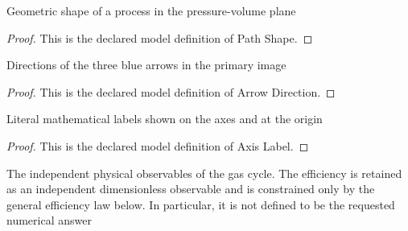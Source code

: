 \begin{definition}
  \label{def:physics:phyx-mini-0352:phyxminiproblems-problemphyxmini0352-pathshape}
  Geometric shape of a process in the pressure-volume plane
\end{definition}
\begin{proof}
  This is the declared model definition of Path Shape.
\end{proof}
\begin{definition}
  \label{def:physics:phyx-mini-0352:phyxminiproblems-problemphyxmini0352-arrowdirection}
  Directions of the three blue arrows in the primary image
\end{definition}
\begin{proof}
  This is the declared model definition of Arrow Direction.
\end{proof}
\begin{definition}
  \label{def:physics:phyx-mini-0352:phyxminiproblems-problemphyxmini0352-axislabel}
  Literal mathematical labels shown on the axes and at the origin
\end{definition}
\begin{proof}
  This is the declared model definition of Axis Label.
\end{proof}
\begin{definition}
  \label{def:physics:phyx-mini-0352:phyxminiproblems-problemphyxmini0352-monatomicidealgascycle}
  The independent physical observables of the gas cycle. The efficiency is retained as an independent dimensionless observable and is constrained only by the general efficiency law below. In particular, it is not defined to be the requested numerical answer
\end{definition}
